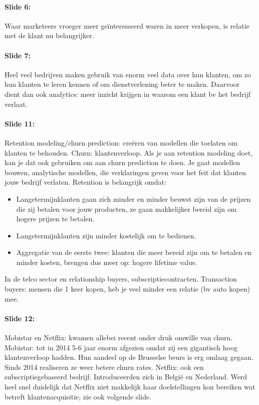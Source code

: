\documentclass[10pt,a4paper]{report}
\begin{document}
\paragraph{Slide 6:}Waar marketeers vroeger meer geïnteresseerd waren in meer verkopen, is relatie met de klant nu belangrijker.

\paragraph{Slide 7:}Heel veel bedrijven maken gebruik van enorm veel data over hun klanten, om zo hun klanten te leren kennen of om dienstverlening beter te maken. Daarvoor dient dan ook analytics: meer inzicht krijgen in waarom een klant bv het bedrijf verlaat. 

\paragraph{Slide 11:}Retention modeling/churn prediction: creëren van modellen die toelaten om klanten te behouden. Churn: klantenverloop. Als je aan retention modeling doet, kan je dat ook gebruiken om aan churn prediction te doen. Je gaat modellen bouwen, analytische modellen, die verklaringen geven voor het feit dat klanten jouw bedrijf verlaten. Retention is belangrijk omdat:
\begin{itemize}
\item Langetermijnklanten gaan zich minder en minder beuwst zijn van de prijzen die zij betalen voor jouw producten, ze gaan makkelijker bereid zijn om hogere prijzen te betalen.
\item Langetermijnklanten zijn minder kostelijk om te bedienen.
\item  Aggregatie van de eerste twee: klanten die meer bereid zijn om te betalen en minder kosten, brengen dus meer op: hogere lifetime value.
\end{itemize}
In de telco sector en relationship buyers, subscriptiecontracten. Transaction buyers: mensen die 1 keer kopen, heb je veel minder een relatie (bv auto kopen) mee.

\paragraph{Slide 12:}Mobistar en Netflix: kwamen allebei recent onder druk omwille van churn. Mobistar: tot in 2014 5-6 jaar enorm afgezien omdat zij een gigantisch hoog klantenverloop hadden. Hun aandeel op de Brusselse beurs is erg omlaag gegaan. Sinds 2014 realiseren ze weer betere churn rates. Netflix: ook een subscriptiegebaseerd bedrijf. Introduceerden zich in België en Nederland. Werd heel snel duidelijk dat Netflix niet makkelijk haar doelstellingen kon bereiken wat betreft klantenacquisitie, zie ook volgende slide.
\end{document}
